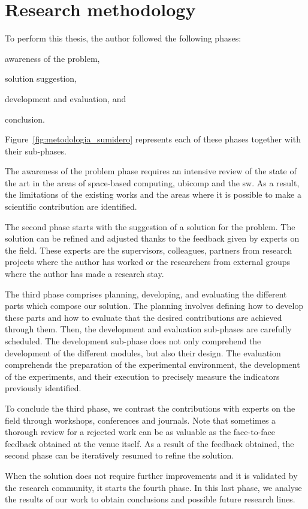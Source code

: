 \section{Research methodology}

To perform this thesis, the author followed the following phases:
\begin{enumerate*}[label=\itshape(\arabic*\upshape)]
  \item awareness of the problem,
  \item solution suggestion,
  \item development and evaluation, and
  \item conclusion.
\end{enumerate*}
Figure~\ref{fig:metodologia_sumidero} represents each of these phases together with their sub-phases. %


The awareness of the problem phase requires an intensive review of the state of the art in the areas of
space-based computing, \acl{ubicomp} and the \acl{sw}.
As a result, the limitations of the existing works and the areas where it is possible to make a scientific contribution are identified.


The second phase starts with the suggestion of a solution for the problem.
The solution can be refined and adjusted thanks to the feedback given by experts on the field.
These experts are the supervisors, colleagues, partners from research projects where the author has worked or the researchers from external groups where the author has made a research stay. %


The third phase comprises planning, developing, and evaluating the different parts which compose our solution.
The planning involves defining how to develop these parts and how to evaluate that the desired contributions are achieved through them.
Then, the development and evaluation sub-phases are carefully scheduled.
The development sub-phase does not only comprehend the development of the different modules, but also their design.
The evaluation comprehends the preparation of the experimental environment, the development of the experiments, and their execution to precisely measure the indicators previously identified. %


To conclude the third phase, we contrast the contributions with experts on the field through workshops, conferences and journals.
Note that sometimes a thorough review for a rejected work can be as valuable as the face-to-face feedback obtained at the venue itself. %
As a result of the feedback obtained, the second phase can be iteratively resumed to refine the solution.


When the solution does not require further improvements and it is validated by the research community, it starts the fourth phase.
In this last phase, we analyse the results of our work to obtain conclusions and possible future research lines.

